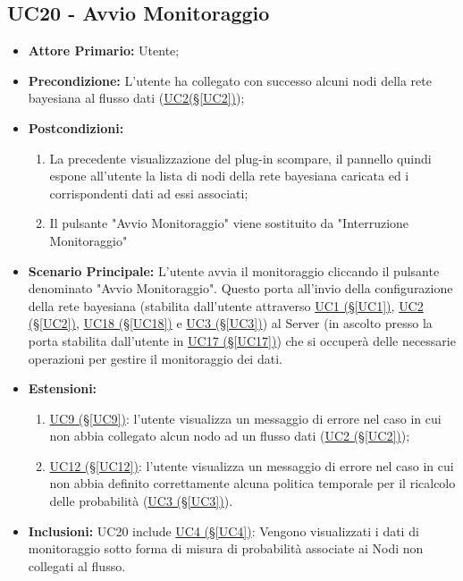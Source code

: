 \pagebreak

\subsection{UC20 - Avvio Monitoraggio}\label{UC20}
\begin{itemize}
	\item \textbf{Attore Primario:} Utente;
	\item \textbf{Precondizione:} L'utente ha collegato con successo alcuni nodi della rete bayesiana al flusso dati (\hyperref[UC2]{UC2(§\ref*{UC2})});
	\item \textbf{Postcondizioni:}
	\begin{enumerate}
		\item La precedente visualizzazione del plug-in scompare, il pannello quindi espone all'utente la lista di nodi della rete bayesiana caricata ed i corrispondenti dati ad essi associati;
		\item Il pulsante "Avvio Monitoraggio" viene sostituito da "Interruzione Monitoraggio"
	\end{enumerate}
	\item \textbf{Scenario Principale:} L'utente avvia il monitoraggio cliccando il pulsante denominato "Avvio Monitoraggio". Questo porta all'invio della configurazione della rete bayesiana (stabilita dall'utente attraverso \hyperref[UC1]{UC1 (§\ref*{UC1})}, \hyperref[UC2]{UC2 (§\ref*{UC2})}, \hyperref[UC18]{UC18 (§\ref*{UC18})} e \hyperref[UC3]{UC3 (§\ref*{UC3})}) al Server (in ascolto presso la porta stabilita dall'utente in \hyperref[UC17]{UC17 (§\ref*{UC17})}) che si occuperà delle necessarie operazioni per gestire il monitoraggio dei dati.
	\item \textbf{Estensioni:}
	\begin{enumerate}
		\item \hyperref[UC9]{UC9 (§\ref*{UC9})}: l'utente visualizza un messaggio di errore nel caso in cui non abbia collegato alcun nodo ad un flusso dati (\hyperref[UC2]{UC2 (§\ref*{UC2})});
		\item \hyperref[UC12]{UC12 (§\ref*{UC12})}: l'utente visualizza un messaggio di errore nel caso in cui non abbia definito correttamente alcuna politica temporale per il ricalcolo delle probabilità (\hyperref[UC3]{UC3 (§\ref*{UC3})}).
	\end{enumerate}
	\item \textbf{Inclusioni:} UC20 include \hyperref[UC4]{UC4 (§\ref*{UC4})}: Vengono visualizzati i dati di monitoraggio sotto forma di misura di probabilità associate ai Nodi non collegati al flusso.
\end{itemize}

